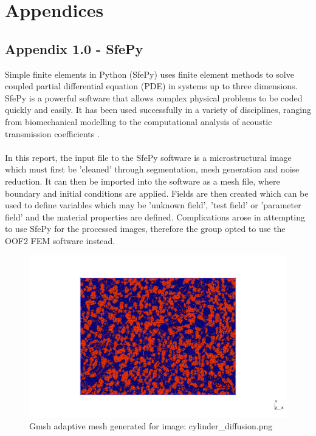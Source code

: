 \documentclass[\report.tex]{subfiles}
\begin{document}
\section{Appendices}

\subsection{Appendix 1.0 - SfePy}
Simple finite elements in Python (SfePy) uses finite element methods to solve coupled partial differential equation (PDE) in systems up to three dimensions. SfePy is a powerful software that allows complex physical problems to be coded quickly and easily. It has been used successfully in a variety of disciplines, ranging from biomechanical modelling \cite{biomedapplication} to the computational analysis of acoustic transmission coefficients \cite{AcousticTransmission}.\\ \\In this report, the input file to the SfePy software is a microstructural image which must first be 'cleaned' through segmentation, mesh generation and noise reduction. It can then be imported into the software as a mesh file, where boundary and initial conditions are applied. Fields are then created which can be used to define variables which may be 'unknown field', 'test field' or 'parameter field' \cite{FEMinSfePy} and the material properties are defined. Complications arose in attempting to use SfePy for the processed images, therefore the group opted to use the OOF2 FEM software instead.

\begin{figure}[h!]
    \centering
    \includegraphics[width=14cm]{Images/out.png}
    \caption{Gmsh adaptive mesh generated for image: cylinder_diffusion.png}
    \label{fig:sfepy_example}
\end{figure}
\end{document}
